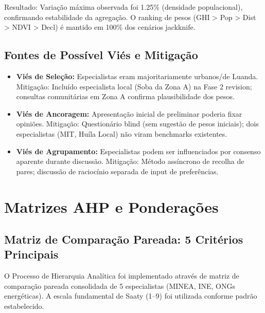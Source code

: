 \documentclass[12pt, a4paper]{article}
\begin{document}
\begin{itemize}
Resultado: Variação máxima observada foi 1.25\% (densidade populacional), confirmando estabilidade da agregação. O ranking de pesos (GHI > Pop > Dist > NDVI > Decl) é mantido em 100\% dos cenários jackknife.

\subsection{Fontes de Possível Viés e Mitigação}

\begin{itemize}
\item \textbf{Viés de Seleção:} Especialistas eram majoritariamente urbanos/de Luanda. Mitigação: Incluído especialista local (Soba da Zona A) na Fase 2 revision; consultas comunitárias em Zona A confirma plausibilidade dos pesos.

\item \textbf{Viés de Ancoragem:} Apresentação inicial de preliminar poderia fixar opiniões. Mitigação: Questionário blind (sem sugestão de pesos iniciais); dois especialistas (MIT, Huíla Local) não viram benchmarks existentes.

\item \textbf{Viés de Agrupamento:} Especialistas podem ser influenciados por consenso aparente durante discussão. Mitigação: Método assíncrono de recolha de pares; discussão de raciocínio separada de input de preferências.
\end{itemize}

\section{Matrizes AHP e Ponderações}
\label{app:ahp_matrix}

\subsection{Matriz de Comparação Pareada: 5 Critérios Principais}

O Processo de Hierarquia Analítica foi implementado através de matriz de comparação pareada consolidada de 5 especialistas (MINEA, INE, ONGs energéticas). A escala fundamental de Saaty (1–9) foi utilizada conforme padrão estabelecido.


\end{itemize}
\end{document}
